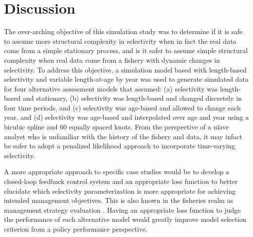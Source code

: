 \section*{Discussion} %
\label{sec:discussion}

The over-arching objective of this simulation study was to determine if it is safe to assume more structural complexity in selectivity when in fact the real data come from a simple stationary process, and is it safer to assume simple structural complexity when real data come from a fishery with dynamic changes in selectivity.  To address this objective, a simulation model based with length-based selectivity and variable length-at-age by year was used to generate simulated data for four alternative assessment models that assumed: (a) selectivity was length-based and stationary, (b) selectivity was length-based and changed discretely in four time periods, and (c) selectivity was age-based and allowed to change each year, and (d) selectivity was age-based and interpolated over age and year using a bicubic spline and 60 equally spaced knots.  From the perspective of a n\"iave analyst who is unfamiliar with the history of the fishery and data, it may infact be safer to adopt a penalized likelihood approach to incorporate time-varying selectivity.


A more appropriate approach to specific case studies would be to develop a closed-loop feedback control system and an appropriate loss function to better elucidate which selectivity parameterization is more appropriate for achieving intended management objectives.  This is also known in the fisheries realm as management strategy evaluation \cite{MSE Crowds}.  Having an appropriate loss function to judge the performance of each alternative model would greatly improve model selection criterion from a policy performance perspective.

